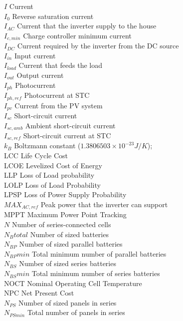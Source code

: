 $I$ Current \\
$I_{0}$ Reverse saturation current \\
$ I_{AC} $ Current that the inverter supply to the house \\
$I_{c,min}$ Charge controller minimum current \\
$ I_{DC} $ Current required by the inverter from the DC source \\
$ I_{in} $ Input current \\
$I_{load}$ Current that feeds the load \\
$ I_{out} $ Output current \\
$I_{ph}$ Photocurrent \\
$ I_{ph,ref} $ Photocurrent at STC \\
$I_{pv}$ Current from the PV system \\
$ I_{sc} $ Short-circuit current \\
$ I_{sc,amb} $ Ambient short-circuit current \\
$ I_{sc,ref} $ Short-circuit current at STC \\
$ k_{B} $ Boltzmann constant ($ 1.3806503\times10^{-23}J/K $); \\
LCC  Life Cycle Cost \\
LCOE Levelized Cost of Energy \\
LLP  Loss of Load probability \\
LOLP Loss of Load Probability \\
LPSP Loss of Power Supply Probability \\
$MAX_{AC,ref}$ Peak power that the inverter can support \\
MPPT Maximum Power Point Tracking \\
$N$ Number of series-connected cells \\
$N_{B}total$ Number of sized batteries \\
$N_{BP}$ Number of sized parallel batteries \\
$N_{BP}min$ Total minimum number of parallel batteries \\
$N_{BS}$ Number of sized series batteries \\
$N_{BS}min$ Total minimum number of series batteries \\
NOCT Nominal Operating Cell Temperature \\
NPC  Net Present Cost \\
$N_{PS}$ Number of sized panels in series \\
$N_{PSmin}$ Total number of panels in series \\
